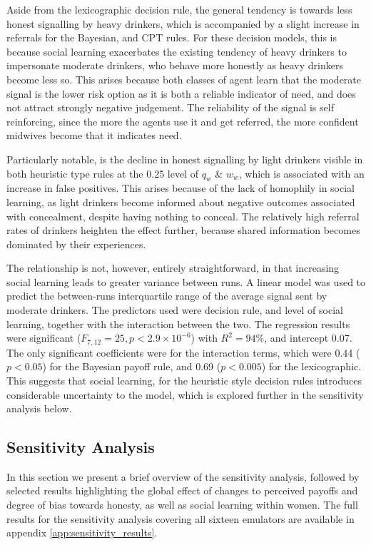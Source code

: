 \documentclass[graybox]{svmult}
\begin{document}
Aside from the lexicographic decision rule, the general tendency is towards less honest signalling by heavy drinkers, which is accompanied by a slight increase in referrals for the Bayesian, and \ac{CPT} rules. For these decision models, this is because social learning exacerbates the existing tendency of heavy drinkers to impersonate moderate drinkers, who behave more honestly as heavy drinkers become less so. This arises because both classes of agent learn that the moderate signal is the lower risk option as it is both a reliable indicator of need, and does not attract strongly negative judgement. The reliability of the signal is self reinforcing, since the more the agents use it and get referred, the more confident midwives become that it indicates need.

Particularly notable, is the decline in honest signalling by light drinkers visible in both heuristic type rules at the 0.25 level of \(q_{w}\) \& \(w_{w}\), which is associated with an increase in false positives. This arises because of the lack of homophily in social learning, as light drinkers become informed about negative outcomes associated with concealment, despite having nothing to conceal. The relatively high referral rates of drinkers heighten the effect further, because shared information becomes dominated by their experiences. 

The relationship is not, however, entirely straightforward, in that increasing social learning leads to greater variance between runs. A linear model was used to predict the between-runs interquartile range of the average signal sent by moderate drinkers. The predictors used were decision rule, and level of social learning, together with the interaction between the two. The regression results were significant (\(F_{7,12}=25,p<2.9\times10^{-6}\)) with \(R^2=94\%\), and intercept 0.07. The only significant coefficients were for the interaction terms, which were 0.44 (\(p<0.05\)) for the Bayesian payoff rule, and 0.69 (\(p<0.005\)) for the lexicographic. This suggests that social learning, for the heuristic style decision rules introduces considerable uncertainty to the model, which is explored further in the sensitivity analysis below.


\subsection{Sensitivity Analysis}
\label{sub:sa_results}

In this section we present a brief overview of the sensitivity analysis, followed by selected results highlighting the global effect of changes to perceived payoffs and degree of bias towards honesty, as well as social learning within women. The full results for the sensitivity analysis covering all sixteen emulators are available in appendix \ref{app:sensitivity_results}.
\end{document}
